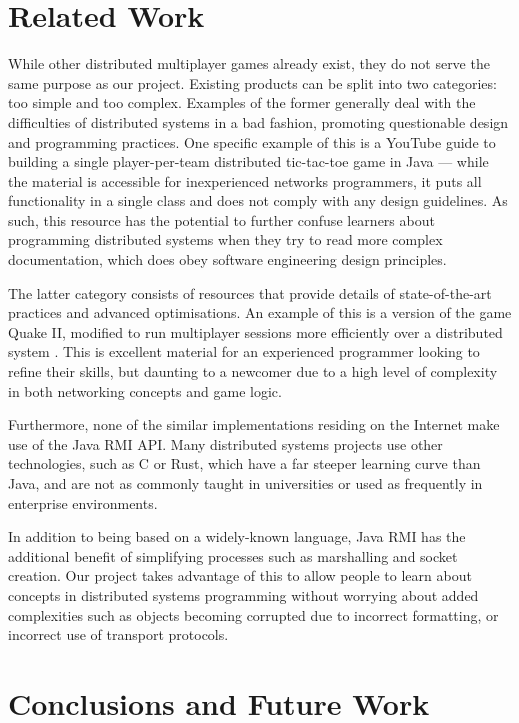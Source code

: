 \documentclass[conference]{IEEEtran}
\begin{document}
\section{Related Work}
While other distributed multiplayer games already exist, they do not serve the same
purpose as our project. Existing products can be split into two categories: too simple and too complex. Examples of the former generally deal with the difficulties of distributed systems in a bad fashion, promoting questionable design and programming practices. One specific example of this is a YouTube guide to building a single player-per-team distributed tic-tac-toe game in Java \cite{MrWayFarOutYoutube15} --- while the material is accessible for inexperienced networks programmers, it puts all functionality in a single class and does not comply with any design guidelines. As such, this resource has the potential to further confuse learners about programming distributed systems when they try to read more complex documentation, which does obey software engineering design principles.

The latter category consists of resources that provide details of state-of-the-art practices and advanced optimisations. An example of this is a version of the game Quake II, modified to run multiplayer sessions more efficiently over a distributed system \cite{DBLP:conf/nsdi/BharambePS06}. This is excellent material for an experienced programmer looking to refine their skills, but daunting to a newcomer due to a high level of complexity in both networking concepts and game logic.

Furthermore, none of the similar implementations residing on the Internet make use of the Java RMI API. Many distributed systems projects use other technologies, such as C or Rust, which have a far steeper learning curve than Java, and are not as commonly taught in universities or used as frequently in enterprise environments.

In addition to being based on a widely-known language, Java RMI has the additional benefit of simplifying processes such as marshalling and socket creation. Our project takes advantage of this to allow people to learn about concepts in distributed systems programming without worrying about added complexities such as objects becoming corrupted due to incorrect formatting, or incorrect use of transport protocols.

\section{Conclusions and Future Work}
\end{document}
